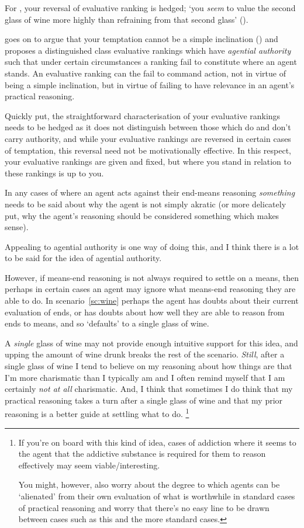 \documentclass[10pt]{article}
\begin{document}
For \citeauthor{Bratman:2007ab}, your reversal of evaluative ranking is hedged; `you \emph{seem} to value the second glass of wine more highly than refraining from that second glass' (\citeyear[emphasis added][257]{Bratman:2007ab}).

\citeauthor{Bratman:2007ab} goes on to argue that your temptation cannot be a simple inclination (\citeyear[cf.][258]{Bratman:2007ab}) and proposes a distinguished class evaluative rankings which have \emph{agential authority} such that under certain circumstances a ranking fail to constitute where an agent stands.
An evaluative ranking can the fail to command action, not in virtue of being a simple inclination, but in virtue of failing to have relevance in an agent's practical reasoning.

Quickly put, the straightforward characterisation of your evaluative rankings needs to be hedged as it does not distinguish between those which do and don't carry authority, and while your evaluative rankings are reversed in certain cases of temptation, this reversal need not be motivationally effective.
In this respect, your evaluative rankings are given and fixed, but where you stand in relation to these rankings is up to you.

In any cases of where an agent acts against their end-means reasoning \emph{something} needs to be said about why the agent is not simply akratic (or more delicately put, why the agent's reasoning should be considered something which makes sense).

Appealing to agential authority is one way of doing this, and I think there is a lot to be said for the idea of agential authority.

However, if means-end reasoning is not always required to settle on a means, then perhaps in certain cases an agent may ignore what means-end reasoning they are able to do.
In scenario~\ref{sc:wine} perhaps the agent has doubts about their current evaluation of ends, or has doubts about how well they are able to reason from ends to means, and so `defaults' to a single glass of wine.

A \emph{single} glass of wine may not provide enough intuitive support for this idea, and upping the amount of wine drunk breaks the rest of the scenario.
\emph{Still}, after a single glass of wine I tend to believe on my reasoning about how things are that I'm more charismatic than I typically am and I often remind myself that I am certainly \emph{not at all} charismatic.
And, I think that sometimes I do think that my practical reasoning takes a turn after a single glass of wine and that my prior reasoning is a better guide at settling what to do.\nolinebreak
\footnote{If you're on board with this kind of idea, cases of addiction where it seems to the agent that the addictive substance is required for them to reason effectively may seem viable/interesting.

  You might, however, also worry about the degree to which agents can be `alienated' from their own evaluation of what is worthwhile in standard cases of practical reasoning and worry that there's no easy line to be drawn between cases such as this and the more standard cases.
}
\end{document}
